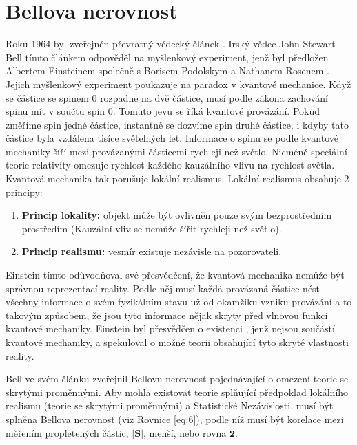 \section{Bellova nerovnost}

Roku 1964 byl zveřejněn převratný vědecký článek \parencite{bellineq}. Irský vědec John Stewart Bell tímto článkem odpověděl na myšlenkový experiment, jenž byl předložen Albertem Einsteinem společně s Borisem Podolskym a Nathanem Rosenem \parencite*{eprpar}. Jejich myšlenkový experiment poukazuje na paradox v kvantové mechanice. Když se částice se spinem 0 rozpadne na dvě částice, musí podle zákona zachování spinu mít v součtu spin 0. Tomuto jevu se říká kvantové provázání. Pokud změříme spin jedné částice, instantně se dozvíme spin druhé částice, i kdyby tato částice byla vzdálena tisíce světelných let. Informace o spinu se podle kvantové mechaniky šíří mezi provázanými částicemi rychleji než světlo. Nicméně speciální teorie relativity omezuje rychlost každého kauzálního vlivu na rychlost světla. Kvantová mechanika tak porušuje lokální realismus. Lokální realismus obsahuje 2 principy:
    \begin{enumerate}
        \item \textbf{Princip lokality:} objekt může být ovlivněn pouze svým bezprostředním prostředím (Kauzální vliv se nemůže šířit rychleji než světlo). \parencite{lokalita}
        \item \textbf{Princip realismu:} vesmír existuje nezávisle na pozorovateli. \parencite{realismus}
    \end{enumerate}
    
Einstein tímto odůvodňoval své přesvědčení, že kvantová mechanika nemůže být správnou reprezentací reality. Podle něj musí každá provázaná částice nést všechny informace o svém fyzikálním stavu už od okamžiku vzniku provázání a to takovým způsobem, že jsou tyto informace nějak skryty před vlnovou funkcí kvantové mechaniky. Einstein byl přesvědčen o existenci , jenž nejsou součástí kvantové mechaniky, a spekuloval o možné teorii obsahující tyto skryté vlastnosti reality.

Bell ve svém článku \parencite*{bellineq} zveřejnil Bellovu nerovnost pojednávající o omezení teorie se skrytými proměnnými. Aby mohla existovat teorie splňující předpoklad lokálního realismu (teorie se skrytými proměnnými) a Statistické Nezávislosti, musí být splněna Bellova nerovnost (viz Rovnice \ref{eq:6}), podle níž musí být korelace mezi měřením propletených částic, $\bm{|S|}$, menší, nebo rovna $\bm{2}$.

